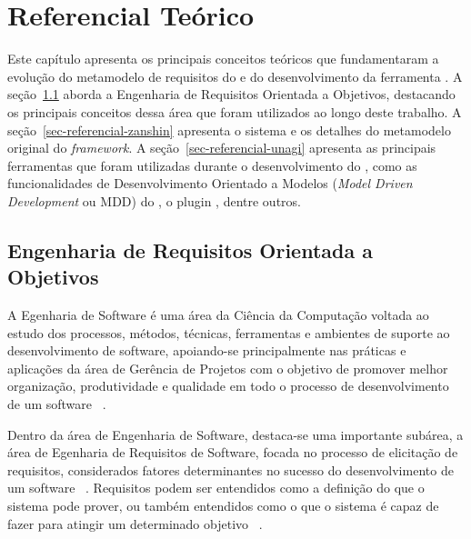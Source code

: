 
% 
\chapter{Referencial Teórico}
\label{sec-referencial}

Este capítulo apresenta os principais conceitos teóricos que fundamentaram a evolução do metamodelo de requisitos do \zanshin e do desenvolvimento da ferramenta \unagi. A seção~\ref{sec-referencial-engenharia-objetivos} aborda a Engenharia de Requisitos Orientada a Objetivos, destacando os principais conceitos dessa área que foram utilizados ao longo deste trabalho. A seção~\ref{sec-referencial-zanshin} apresenta o sistema \zanshin e os detalhes do metamodelo original do \textit{framework}. A seção~\ref{sec-referencial-unagi} apresenta as principais ferramentas que foram utilizadas durante o desenvolvimento do \unagi, como as funcionalidades de Desenvolvimento Orientado a Modelos (\textit{Model Driven Development} ou MDD) do \eclipse, o plugin \sirius, dentre outros.


\section{Engenharia de Requisitos Orientada a Objetivos}
\label{sec-referencial-engenharia-objetivos}

A Egenharia de Software é uma área da Ciência da Computação voltada ao estudo dos processos, métodos, técnicas, ferramentas e ambientes de suporte ao desenvolvimento de software, apoiando-se principalmente nas práticas e aplicações da área de Gerência de Projetos com o objetivo de promover melhor organização, produtividade e qualidade em todo o processo de desenvolvimento de um software ~\cite{falboEngSoft}.

Dentro da área de Engenharia de Software, destaca-se uma importante subárea, a área de Egenharia de Requisitos de Software, focada no processo de elicitação de requisitos, considerados fatores determinantes no sucesso do desenvolvimento de um software ~\cite{falboEngReq}. Requisitos podem ser entendidos como a definição do que o sistema pode prover, ou também entendidos como o que o sistema é capaz de fazer para atingir um determinado objetivo ~\cite{pfleeger2004engenharia}.

